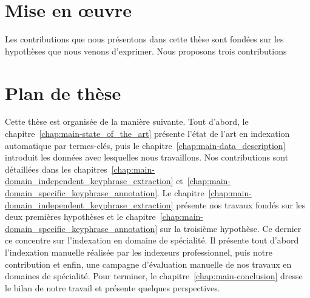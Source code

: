 
  \section{Mise en \oe{}uvre}
  \label{sec:main-introduction-realisation}
  Les contributions que nous présentons dans cette thèse sont fondées sur les
  hypothèses que nous venons d'exprimer. Nous proposons trois
  contributions


  \section{Plan de thèse}
  \label{sec:main-introduction-outline}
    Cette thèse est organisée de la manière suivante. Tout d'abord, le
    chapitre~\ref{chap:main-state_of_the_art} présente l'état de l'art en
    indexation automatique par termes-clés, puis le
    chapitre~\ref{chap:main-data_description} introduit les données avec
    lesquelles nous travaillons. Nos contributions sont détaillées dans les
    chapitres~\ref{chap:main-domain_independent_keyphrase_extraction}
    et~\ref{chap:main-domain_specific_keyphrase_annotation}. Le
    chapitre~\ref{chap:main-domain_independent_keyphrase_extraction} présente
    nos travaux fondés sur les deux premières hypothèses et le
    chapitre~\ref{chap:main-domain_specific_keyphrase_annotation} sur la
    troisième hypothèse. Ce dernier ce concentre sur l'indexation en domaine de
    spécialité. Il présente tout d'abord l'indexation manuelle réalisée par les
    indexeurs professionnel, puis notre contribution et enfin, une campagne
    d'évaluation manuelle de nos travaux en domaines de spécialité. Pour
    terminer, le chapitre~\ref{chap:main-conclusion} dresse le bilan de notre
    travail et présente quelques perspectives.

